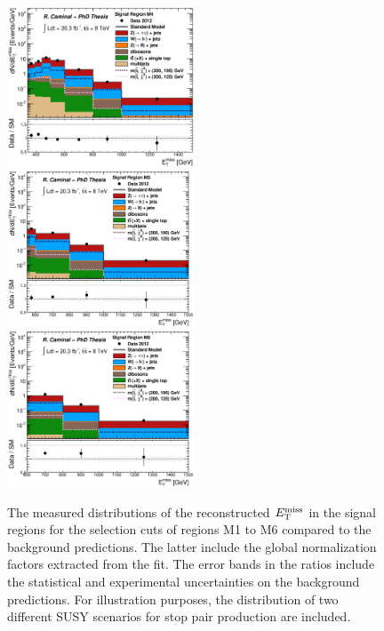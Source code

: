 \begin{figure}[!ht]
\begin{center}
{      \includegraphics[width=0.495\textwidth]{MonojetAnalysis/Figures/plot_Stop_A8_SR_met_fitted.eps}
    }
    \mbox{
      \includegraphics[width=0.495\textwidth]{MonojetAnalysis/Figures/plot_Stop_A9_SR_met_fitted.eps}
      \includegraphics[width=0.495\textwidth]{MonojetAnalysis/Figures/plot_Stop_A10_SR_met_fitted.eps}
    }
  \end{center}
  \caption[Distributions of the reconstructed $\met$ in the signal regions for the selection cuts of regions M1 to M6, after the normalization factors extracted from the fit have been applied.]{The measured distributions of the reconstructed $\met$ in the signal regions for the selection cuts of regions M1 to M6 compared to the background predictions. The latter include the global normalization factors extracted from the fit. The error bands in the ratios include the statistical and experimental uncertainties on the background predictions. For illustration purposes, the distribution of two different SUSY scenarios for stop pair production are included.}
  \label{fig:Plot_M1_SR_met}
\end{figure}

